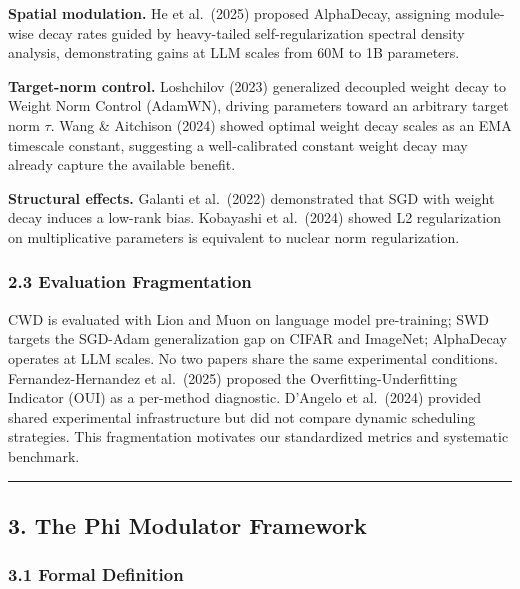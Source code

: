 \documentclass[
]{article}
\begin{document}
\textbf{Spatial modulation.} He et al.~(2025) proposed AlphaDecay,
assigning module-wise decay rates guided by heavy-tailed
self-regularization spectral density analysis, demonstrating gains at
LLM scales from 60M to 1B parameters.

\textbf{Target-norm control.} Loshchilov (2023) generalized decoupled
weight decay to Weight Norm Control (AdamWN), driving parameters toward
an arbitrary target norm \(\tau\). Wang \& Aitchison (2024) showed
optimal weight decay scales as an EMA timescale constant, suggesting a
well-calibrated constant weight decay may already capture the available
benefit.

\textbf{Structural effects.} Galanti et al.~(2022) demonstrated that SGD
with weight decay induces a low-rank bias. Kobayashi et al.~(2024)
showed L2 regularization on multiplicative parameters is equivalent to
nuclear norm regularization.

\hypertarget{evaluation-fragmentation}{%
\subsubsection{2.3 Evaluation
Fragmentation}\label{evaluation-fragmentation}}

CWD is evaluated with Lion and Muon on language model pre-training; SWD
targets the SGD-Adam generalization gap on CIFAR and ImageNet;
AlphaDecay operates at LLM scales. No two papers share the same
experimental conditions. Fernandez-Hernandez et al.~(2025) proposed the
Overfitting-Underfitting Indicator (OUI) as a per-method diagnostic.
D'Angelo et al.~(2024) provided shared experimental infrastructure but
did not compare dynamic scheduling strategies. This fragmentation
motivates our standardized metrics and systematic benchmark.

\begin{center}\rule{0.5\linewidth}{0.5pt}\end{center}

\hypertarget{the-phi-modulator-framework}{%
\subsection{3. The Phi Modulator
Framework}\label{the-phi-modulator-framework}}

\hypertarget{formal-definition}{%
\subsubsection{3.1 Formal Definition}\label{formal-definition}}
\end{document}
